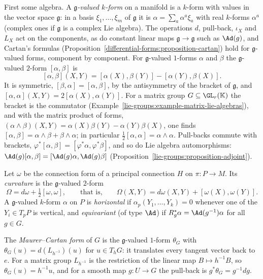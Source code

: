 First some algebra. A \emph{$\mathfrak{g}$-valued $k$-form} on a manifold is a $k$-form with values in the vector space $\mathfrak{g}$: in a basis $\xi_1, \ldots, \xi_m$ of $\mathfrak{g}$ it is
$\alpha = \sum_a\alpha^a\xi_a$ with real $k$-forms $\alpha^a$ (complex ones if $\mathfrak{g}$ is a complex Lie algebra). The operations $d$, pull-back, $\iota_X$ and $L_X$ act on the components, as do constant linear maps
$\mathfrak{g} \to \mathfrak{g}$ such as $\Ad(g)$, and Cartan's formulas (Proposition~\ref{differential-forms:proposition-cartan}) hold for $\mathfrak{g}$-valued forms, component by component. For
$\mathfrak{g}$-valued $1$-forms $\alpha$ and $\beta$ the $\mathfrak{g}$-valued $2$-form $[\alpha, \beta]$ is
\[
[\alpha, \beta](X, Y) = [\alpha(X), \beta(Y)] - [\alpha(Y), \beta(X)] .
\]
It is symmetric, $[\beta, \alpha] = [\alpha, \beta]$, by the antisymmetry of the bracket of $\mathfrak{g}$, and $[\alpha, \alpha](X, Y) = 2[\alpha(X), \alpha(Y)]$. For a matrix group
$G \subseteq \GL_r(\mathbb{K})$ the bracket is the commutator (Example~\ref{lie-groups:example-matrix-lie-algebras}), and with the matrix product of forms,
$(\alpha \wedge \beta)(X, Y) = \alpha(X)\beta(Y) - \alpha(Y)\beta(X)$, one finds $[\alpha, \beta] = \alpha \wedge \beta + \beta \wedge \alpha$; in particular $\frac12[\alpha, \alpha] = \alpha \wedge \alpha$.
Pull-backs commute with brackets, $\varphi^*[\alpha, \beta] = [\varphi^*\alpha, \varphi^*\beta]$, and so do Lie algebra automorphisms: $\Ad(g)[\alpha, \beta] = [\Ad(g)\alpha, \Ad(g)\beta]$
(Proposition~\ref{lie-groups:proposition-adjoint}).

\begin{definition}\label{connections:definition-principal-curvature}
Let $\omega$ be the connection form of a principal connection $H$ on $\pi \colon P \to M$. Its \emph{curvature} is the $\mathfrak{g}$-valued $2$-form
\[
\Omega = d\omega + \tfrac12[\omega, \omega], \qquad \text{that is,} \qquad \Omega(X, Y) = d\omega(X, Y) + [\omega(X), \omega(Y)] .
\]
A $\mathfrak{g}$-valued $k$-form $\alpha$ on $P$ is \emph{horizontal} if $\alpha_p(Y_1, \ldots, Y_k) = 0$ whenever one of the $Y_i \in T_pP$ is vertical, and \emph{equivariant} (of type $\Ad$) if
$R_g^*\alpha = \Ad(g^{-1})\alpha$ for all $g \in G$.
\end{definition}

The \emph{Maurer--Cartan form} of $G$ is the $\mathfrak{g}$-valued $1$-form $\theta_G$ with $\theta_G(u) = d(L_{h^{-1}})(u)$ for $u \in T_hG$: it translates every tangent vector back to $e$. For a matrix
group $L_{h^{-1}}$ is the restriction of the linear map $B \mapsto h^{-1}B$, so $\theta_G(u) = h^{-1}u$, and for a smooth map $g \colon U \to G$ the pull-back is $g^*\theta_G = g^{-1}dg$.

